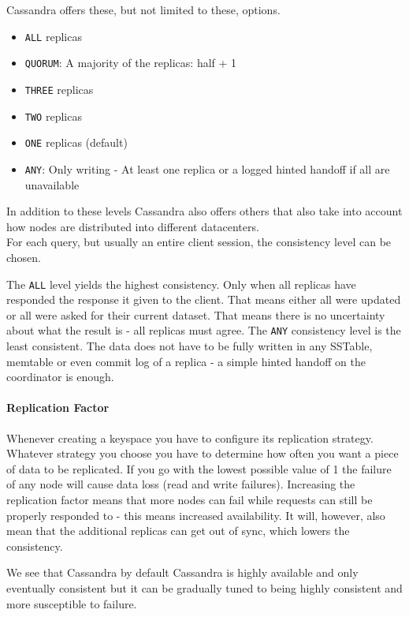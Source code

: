 Cassandra offers these, but not limited to these, options. \autocite{datastax_consistency_level}

\begin{itemize}
  \item \texttt{ALL} replicas
  \item \texttt{QUORUM}: A majority of the replicas: half + 1
  \item \texttt{THREE} replicas
  \item \texttt{TWO} replicas
  \item \texttt{ONE} replicas (default)
  \item \texttt{ANY}: Only writing - At least one replica or a logged hinted handoff if all are unavailable
\end{itemize}

In addition to these levels Cassandra also offers others that also take into account how nodes are distributed into different datacenters. \\
For each query, but usually an entire client session, the consistency level can be chosen.

The \texttt{ALL} level yields the highest consistency. Only when all replicas have responded the response it given to the client. That means either all were updated or all were asked for their current dataset. That means there is no uncertainty about what the result is - all replicas must agree. The \texttt{ANY} consistency level is the least consistent. The data does not have to be fully written in any SSTable, memtable or even commit log of a replica - a simple hinted handoff on the coordinator is enough. \autocite[6,7]{cassandraInCAPtheorem}

\paragraph{Replication Factor} Whenever creating a keyspace you have to configure its replication strategy. Whatever strategy you choose you have to determine how often you want a piece of data to be replicated. If you go with the lowest possible value of 1 the failure of any node will cause data loss (read and write failures). Increasing the replication factor means that more nodes can fail while requests can still be properly responded to - this means increased availability. It will, however, also mean that the additional replicas can get out of sync, which lowers the consistency. \autocite[3]{cassandra_paper}

We see that Cassandra by default Cassandra is highly available and only eventually consistent but it can be gradually tuned to being highly consistent and more susceptible to failure. \autocite[2,3]{cassandraInCAPtheorem}

